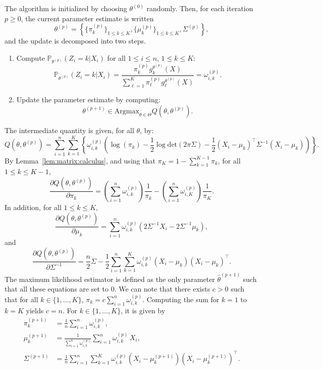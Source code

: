 \documentclass[english,graybox,envcountchap,envcountsame,sectrefs,shortlabels]{svmono}
\theoremstyle{style}
\newcommand{\eqsp}{}
\begin{document}
The algorithm is initialized by choosing $\theta^{(0)}$ randomly. Then, for each iteration $p\geq 0$, the current parameter estimate is written
$$
\theta^{(p)} = \left\{\{\pi^{(p)}_k\}_{1\leq k \leq K}, \{\mu^{(p)}_k\}_{1\leq k \leq K}, \Sigma^{(p)}\right\}\eqsp,
$$
and the update is decomposed into two steps.
\begin{enumerate}
\item Compute $\mathbb{P}_{\theta^{(p)}}(Z_i = k|X_i)$ for all $1\leq i \leq n$, $1\leq k \leq K$:
$$
\mathbb{P}_{\theta^{(p)}}(Z_i = k|X_i) = \frac{\pi^{(p)}_kg^{\theta^{(p)}}_k(X)}{\sum_{\ell=1}^{K}\pi^{(p)}_\ell g^{\theta^{(p)}}_\ell(X)} = \omega_{i,k}^{(p)}\eqsp.
$$
\item Update the parameter estimate by computing:
$$
\theta^{(p+1)} \in \mathrm{Argmax}_{\theta\in\Theta} Q(\theta,\theta^{(p)})\eqsp.
$$
\end{enumerate}
The intermediate quantity is given, for all $\theta$, by:
$$
Q(\theta,\theta^{(p)}) = \sum_{i=1}^n \sum_{k=1}^K \left\{ \omega_{i,k}^{(p)}\left( \log(\pi_k) -\frac{1}{2}\log \mathrm{det}(2\pi \Sigma) -\frac{1}{2}(X_i - \mu_{k})^\top \Sigma^{-1}(X_i - \mu_{k})\right) \right\} \eqsp.
$$
By Lemma~\ref{lem:matrix:calculus}, and using that $\pi_K = 1-\sum_{k=1}^{K-1}\pi_k$, for all $1\leq k \leq K-1$,
$$
\frac{\partial Q(\theta,\theta^{(p)}) }{\partial \pi_k} = \left(\sum_{i=1}^n\omega_{i,k}^{(p)}\right)\frac{1}{\pi_k} - \left(\sum_{i=1}^n\omega_{i,K}^{(p)}\right)\frac{1}{\pi_K}\eqsp.
$$
In addition, for all $1\leq k \leq K$,
$$
\frac{\partial Q(\theta,\theta^{(p)}) }{\partial \mu_k} = \sum_{i=1}^n \omega_{i,k}^{(p)} \left(2\Sigma^{-1}X_i - 2\Sigma^{-1}\mu_{k}\right)\eqsp,
$$
and
$$
\frac{\partial Q(\theta,\theta^{(p)}) }{\partial \Sigma^{-1}} = \frac{n}{2}\Sigma -  \frac{1}{2}\sum_{i=1}^n\sum_{k=1}^K \omega_{i,k}^{(p)}\left(X_i - \mu_{k}\right)\left(X_i - \mu_{k}\right)^\top \eqsp.
$$
The maximum likelihood estimator is defined as the only parameter $\widehat \theta^{(p+1)}$ such that all these equations are set to 0. 
We can note that there exists $c>0$ such that for all $k\in\{1,\ldots,K\}$, $\pi_k = c\sum_{i=1}^n\omega_{i,k}^{(p)}$. Computing the sum for $k=1$ to $k=K$ yields $c=n$. For $k\in\{1,\ldots,K\}$,  it is given by
\begin{align*}
\pi_k^{(p+1)} &= \frac{1}{n}\sum_{i=1}^n\omega_{i,k}^{(p)}\eqsp,\\
\mu_k^{(p+1)} &= \frac{1}{\sum_{i=1}^n\omega_{i,k}^{(p)}}\sum_{i=1}^n\omega_{i,k}^{(p)}\,X_i\eqsp,\\
\Sigma^{(p+1)} &= \frac{1}{n}\sum_{i=1}^n\sum_{k=1}^K\omega_{i,k}^{(p)}\left(X_i - \mu_{k}^{(p+1)}\right)\left(X_i - \mu_{k}^{(p+1)}\right)^\top\eqsp.
\end{align*}
\end{document}
